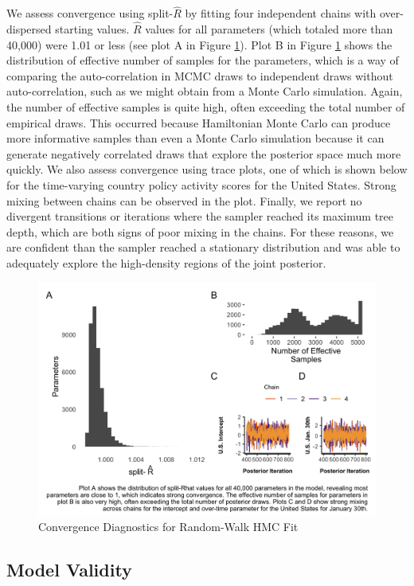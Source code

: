 \documentclass[]{article}
\begin{document}
We assess convergence using split-\(\hat{R}\) by fitting four independent chains with over-dispersed starting values. \(\hat{R}\) values for all parameters (which totaled more than 40,000) were 1.01 or less (see plot A in Figure \ref{fig:modelconv}). Plot B in Figure \ref{fig:modelconv} shows the distribution of effective number of samples for the parameters, which is a way of comparing the auto-correlation in MCMC draws to independent draws without auto-correlation, such as we might obtain from a Monte Carlo simulation. Again, the number of effective samples is quite high, often exceeding the total number of empirical draws. This occurred because Hamiltonian Monte Carlo can produce more informative samples than even a Monte Carlo simulation because it can generate negatively correlated draws that explore the posterior space much more quickly. We also assess convergence using trace plots, one of which is shown below for the time-varying country policy activity scores for the United States. Strong mixing between chains can be observed in the plot. Finally, we report no divergent transitions or iterations where the sampler reached its maximum tree depth, which are both signs of poor mixing in the chains. For these reasons, we are confident than the sampler reached a stationary distribution and was able to adequately explore the high-density regions of the joint posterior.

\begin{figure}
\includegraphics[width=6.5in]{mcmc_evaluate} \caption{Convergence Diagnostics for Random-Walk HMC Fit}\label{fig:modelconv}
\end{figure}

\hypertarget{model-validity}{%
\subsection*{Model Validity}\label{model-validity}}
\end{document}
